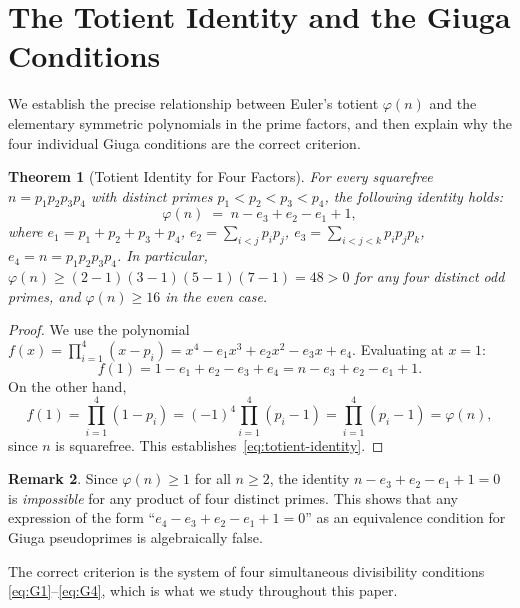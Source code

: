 \documentclass[12pt,a4paper]{amsart}
\newtheorem{theorem}{Theorem}[section]
\theoremstyle{definition}
\newtheorem{remark}[theorem]{Remark}
\begin{document}
\section{The Totient Identity and the Giuga Conditions}
\label{sec:identity}

We establish the precise relationship between Euler's totient $\varphi(n)$
and the elementary symmetric polynomials in the prime factors, and then
explain why the four individual Giuga conditions are the correct criterion.

\begin{theorem}[Totient Identity for Four Factors]
\label{thm:identity}
For every squarefree $n = p_1 p_2 p_3 p_4$ with distinct primes
$p_1 < p_2 < p_3 < p_4$, the following identity holds:
\begin{equation}
  \varphi(n) \;=\; n - e_3 + e_2 - e_1 + 1,
  \label{eq:totient-identity}
\end{equation}
where $e_1 = p_1 + p_2 + p_3 + p_4$, $e_2 = \sum_{i<j} p_i p_j$,
$e_3 = \sum_{i<j<k} p_i p_j p_k$, $e_4 = n = p_1 p_2 p_3 p_4$.
In particular, $\varphi(n) \ge (2-1)(3-1)(5-1)(7-1) = 48 > 0$ for any
four distinct odd primes, and $\varphi(n) \ge 16$ in the even case.
\end{theorem}

\begin{proof}
We use the polynomial $f(x) = \prod_{i=1}^{4}(x - p_i) = x^4 - e_1 x^3
+ e_2 x^2 - e_3 x + e_4$.  Evaluating at $x = 1$:
\[
  f(1) = 1 - e_1 + e_2 - e_3 + e_4 = n - e_3 + e_2 - e_1 + 1.
\]
On the other hand,
\[
  f(1) = \prod_{i=1}^{4}(1 - p_i) = (-1)^4 \prod_{i=1}^{4}(p_i - 1)
  = \prod_{i=1}^{4}(p_i - 1) = \varphi(n),
\]
since $n$ is squarefree.  This establishes~\eqref{eq:totient-identity}.
\end{proof}

\begin{remark}
\label{rem:identity-impossible}
Since $\varphi(n) \ge 1$ for all $n \ge 2$, the identity
$n - e_3 + e_2 - e_1 + 1 = 0$ is \emph{impossible} for any product of
four distinct primes.  This shows that any expression of the form
``$e_4 - e_3 + e_2 - e_1 + 1 = 0$'' as an equivalence condition for
Giuga pseudoprimes is algebraically false.

The correct criterion is the system of four simultaneous divisibility
conditions \eqref{eq:G1}--\eqref{eq:G4}, which is what we study throughout
this paper.
\end{remark}
\end{document}
